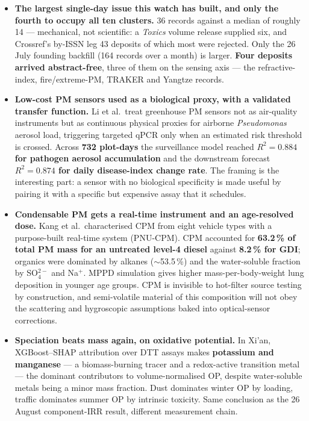 \documentclass[10pt]{article}
\begin{document}
\footnotesize
\begin{itemize}\itemsep2pt
\item \textbf{The largest single-day issue this watch has built, and only the fourth
to occupy all ten clusters.} 36 records against a median of roughly 14 --- mechanical,
not scientific: a \textit{Toxics} volume release supplied six, and Crossref's by-ISSN leg
43 deposits of which most were rejected. Only the 26 July founding backfill (164 records
over a month) is larger. \textbf{Four deposits arrived abstract-free}, three of them on
the sensing axis --- the refractive-index, fire/extreme-PM, TRAKER and Yangtze records.

\item \textbf{Low-cost PM sensors used as a biological proxy, with a validated
transfer function.} Li et al.\ treat greenhouse PM sensors not as air-quality
instruments but as continuous physical proxies for airborne \textit{Pseudomonas}
aerosol load, triggering targeted qPCR only when an estimated risk threshold is crossed.
Across \textbf{732 plot-days} the surveillance model reached
\textbf{$R^2 = 0.884$ for pathogen aerosol accumulation} and the downstream forecast
\textbf{$R^2 = 0.874$ for daily disease-index change rate}. The framing is the
interesting part: a sensor with no biological specificity is made useful by pairing it
with a specific but expensive assay that it schedules.

\item \textbf{Condensable PM gets a real-time instrument and an age-resolved dose.}
Kang et al.\ characterised CPM from eight vehicle types with a purpose-built real-time
system (PNU-CPM). CPM accounted for \textbf{63.2\,\% of total PM mass for an untreated
level-4 diesel} against \textbf{8.2\,\% for GDI}; organics were dominated by alkanes
($\sim$53.5\,\%) and the water-soluble fraction by SO$_4^{2-}$ and Na$^+$. MPPD
simulation gives higher mass-per-body-weight lung deposition in younger age groups.
CPM is invisible to hot-filter source testing by construction, and semi-volatile
material of this composition will not obey the scattering and hygroscopic assumptions
baked into optical-sensor corrections.

\item \textbf{Speciation beats mass again, on oxidative potential.} In Xi'an,
XGBoost--SHAP attribution over DTT assays makes \textbf{potassium and manganese} --- a
biomass-burning tracer and a redox-active transition metal --- the dominant contributors
to volume-normalised OP, despite water-soluble metals being a minor mass fraction. Dust
dominates winter OP by loading, traffic dominates summer OP by intrinsic toxicity. Same
conclusion as the 26 August component-IRR result, different measurement chain.


\end{itemize}
\end{document}
